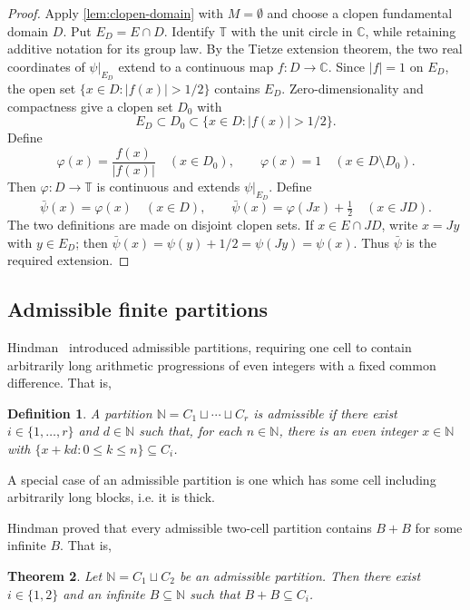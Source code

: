 \documentclass[reqno,12pt]{amsart}
\newtheorem{thm}{Theorem}[section]
\newtheorem{defn}[thm]{Definition}
\newcommand{\Torus}{\mathbb T}
\def \N {\mathbb N}
\numberwithin{equation}{section}
\begin{document}
\begin{proof}
Apply \cref{lem:clopen-domain} with $M=\emptyset$ and choose
a clopen fundamental domain $D$. Put $E_D=E\cap D$. Identify $\Torus$ with
the unit circle in $\mathbb C$, while retaining additive notation for its
group law. By the Tietze extension theorem,
the two real coordinates of $\psi|_{E_D}$ extend to a continuous map
$f:D\to\mathbb C$. Since $|f|=1$ on $E_D$, the open set
$\{x\in D:|f(x)|>1/2\}$ contains $E_D$. Zero-dimensionality and compactness
give a clopen set $D_0$ with
\[
 E_D\subset D_0\subset\{x\in D:|f(x)|>1/2\}.
\]
Define
\[
 \varphi(x)=\frac{f(x)}{|f(x)|}\quad(x\in D_0),
 \qquad
 \varphi(x)=1\quad(x\in D\setminus D_0).
\]
Then $\varphi:D\to\Torus$ is continuous and extends $\psi|_{E_D}$. Define
\[
 \bar\psi(x)=\varphi(x)\quad(x\in D),
 \qquad
 \bar\psi(x)=\varphi(Jx)+\tfrac12\quad(x\in JD).
\]
The two definitions are made on disjoint clopen sets. If $x\in E\cap JD$,
write $x=Jy$ with $y\in E_D$; then
$\bar\psi(x)=\psi(y)+1/2=\psi(Jy)=\psi(x)$. Thus $\bar\psi$ is the required
extension.
\end{proof}

\subsection{Admissible finite partitions}


Hindman~\cite[Definition~2.2]{Neil79}
introduced admissible partitions, requiring one cell to contain arbitrarily
long arithmetic progressions of even integers with a fixed common
difference. That is,

\begin{defn}\cite[Definition~2.2]{Neil79}\label{defn-hindman}
A partition $\N=C_1\sqcup \cdots \sqcup C_r$  is {\em admissible} if there exist $i\in \{1,\ldots,r\}$ and $d\in \N$ such that, for each $n\in \N$, there  is an even integer $x\in \N$ with $\{x+kd:0\le k\le n\}\subseteq C_i$.
\end{defn}

A special case of an admissible partition is one which has some cell
including arbitrarily long blocks, i.e. it is thick.

Hindman proved that every admissible two-cell partition contains
$B+B$ for some infinite $B$. That is,

\begin{thm}\cite[Corollary~2.10]{Neil79}\label{thm:Hindman-even-ap}
	Let $\N=C_1\sqcup C_2$ be an admissible partition.  Then there exist $i\in \{1,2\}$ and an infinite $B\subseteq\N$ such that
	$B+B\subseteq C_i$.
\end{thm}
\end{document}
